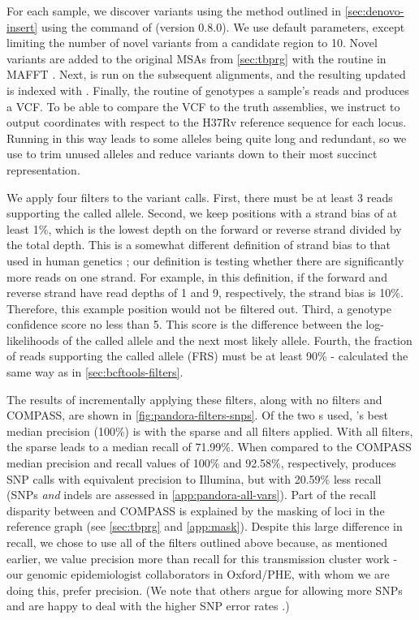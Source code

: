 For each sample, we discover \denovo{} variants using the method outlined in \autoref{sec:denovo-insert} using the  command of \pandora{} (version 0.8.0). We use default parameters, except limiting the number of novel variants from a candidate region to 10. Novel variants are added to the original MSAs from \autoref{sec:tbprg} with the  routine in MAFFT \cite{katoh2012}. Next, \makeprg{} is run on the subsequent alignments, and the resulting updated \panrg{} is indexed with \pandora{}. Finally, the  routine of \pandora{} genotypes a sample's reads and produces a VCF. To be able to compare the \pandora{} VCF to the truth assemblies, we instruct \pandora{} to output coordinates with respect to the H37Rv reference sequence for each locus. Running \pandora{} in this way leads to some alleles being quite long and redundant, so we use  to trim unused alleles and reduce variants down to their most succinct representation. 

We apply four filters to the \pandora{} variant calls. First, there must be at least 3 reads supporting the called allele. Second, we keep positions with a strand bias of at least 1\%, which is the lowest depth on the forward or reverse strand divided by the total depth. This is a somewhat different definition of strand bias to that used in human genetics \cite{guo2012effect}; our definition is testing whether there are significantly more reads on one strand. For example, in this definition, if the forward and reverse strand have read depths of 1 and 9, respectively, the strand bias is 10\%. Therefore, this example position would not be filtered out. Third, a genotype confidence score no less than 5. This score is the difference between the log-likelihoods of the called allele and the next most likely allele. Fourth, the fraction of reads supporting the called allele (FRS) must be at least 90\%  - calculated the same way as in \autoref{sec:bcftools-filters}.

The results of incrementally applying these filters, along with no filters and COMPASS, are shown in \autoref{fig:pandora-filters-snps}. Of the two \panrg{}s used, \pandora{}'s best median precision (100\%) is with the sparse \panrg{} and all filters applied. With all filters, the sparse \panrg{} leads to a median recall of 71.99\%. When compared to the COMPASS median precision and recall values of 100\% and 92.58\%, respectively, \pandora{} produces \ont{} SNP calls with equivalent precision to Illumina, but with 20.59\% less recall (SNPs \emph{and} indels are assessed in \autoref{app:pandora-all-vars}). Part of the recall disparity between \pandora{} and COMPASS is explained by the masking of loci in the reference graph (see \autoref{sec:tbprg} and \autoref{app:mask}). Despite this large difference in recall, we chose to use all of the filters outlined above because, as mentioned earlier, we value \ont{} precision more than recall for this transmission cluster work - our genomic epidemiologist collaborators in Oxford/PHE, with whom we are doing this, prefer precision. (We note that others argue for allowing more SNPs and are happy to deal with the higher SNP error rates \cite{walter2020}.)

